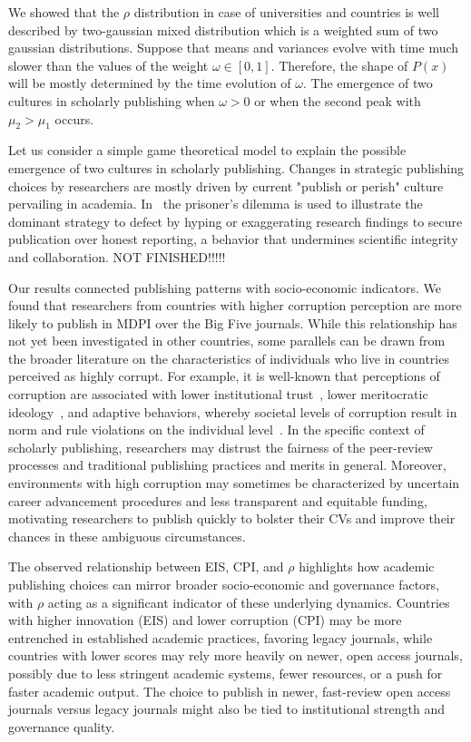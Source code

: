 \documentclass[amsfonts, amssymb, prl, superscriptaddress, notitlepage, twocolumn, nofootinbib]{revtex4-2}
\begin{document}
We showed that the $\rho$ distribution in case of universities and countries is well described by two-gaussian mixed distribution which is a weighted sum of two gaussian distributions. Suppose that means and variances evolve with time much slower than the values of the weight $\omega\in [0, 1]$.  Therefore, the shape of $P(x)$ will be mostly determined by the time evolution of $\omega$. The emergence of two cultures in scholarly publishing when $\omega > 0$ or when the second peak with $\mu_2 >\mu_1$ occurs.  

Let us consider a simple game theoretical model to explain the possible emergence of two cultures in scholarly publishing.
Changes in strategic publishing choices by researchers are mostly driven by current "publish or perish" culture pervailing in academia. In~\cite{publish-and-flourish_2019} the prisoner’s dilemma is used to illustrate the dominant strategy to defect by hyping or exaggerating research findings to secure publication over honest reporting, a behavior that undermines scientific integrity and collaboration. NOT FINISHED!!!!!

Our results connected publishing patterns with socio-economic indicators. We found that researchers from countries with higher corruption perception are more likely to publish in MDPI over the Big Five journals. While this relationship has not yet been investigated in other countries, some parallels can be drawn from the broader literature on the characteristics of individuals who live in countries perceived as highly corrupt. For example, it is well-known that perceptions of corruption are associated with lower institutional trust~\cite{hakhverdian2012}, lower meritocratic ideology~\cite{tan2017}, and adaptive behaviors, whereby societal levels of corruption result in norm and rule violations on the individual level~\cite{kobis2018}. In the specific context of scholarly publishing, researchers may distrust the fairness of the peer-review processes and traditional publishing practices and merits in general. Moreover, environments with high corruption may sometimes be characterized by uncertain career advancement procedures and less transparent and equitable funding, motivating researchers to publish quickly to bolster their CVs and improve their chances in these ambiguous circumstances. 

The observed relationship between EIS, CPI, and $\rho$ highlights how academic publishing choices can mirror broader socio-economic and governance factors, with $\rho$ acting as a significant indicator of these underlying dynamics. Countries with higher innovation (EIS) and lower corruption (CPI) may be more entrenched in established academic practices, favoring legacy journals, while countries with lower scores may rely more heavily on newer, open access journals, possibly due to less stringent academic systems, fewer resources, or a push for faster academic output. The choice to publish in newer, fast-review open access journals versus legacy journals might also be tied to institutional strength and governance quality. 
\end{document}
